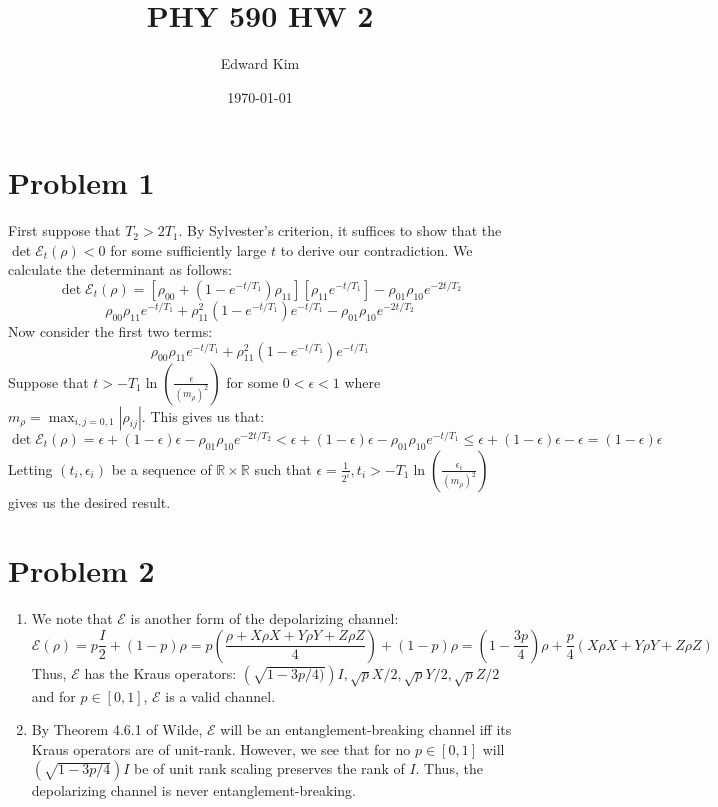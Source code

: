 \documentclass[12pt]{article}%
\begin{document}
\title{PHY 590 HW 2}
\author{Edward Kim}
\date{\today}
\maketitle

\section*{Problem 1}
First suppose that $T_2 > 2T_1$. By Sylvester's criterion, it suffices to show that the $\det{\mathcal{E}_t(\rho)} < 0$ for some sufficiently large $t$ to derive our contradiction. \newline \newline
We calculate the determinant as follows:
$$ \det{\mathcal{E}_t(\rho)} = [\rho_{00} + (1 - e^{-t/T_1})\rho_{11}][\rho_{11} e^{-t/T_1}] - \rho_{01}\rho_{10}e^{-2t/T_2}$$
$$\rho_{00}\rho_{11}e^{-t/T_1} + \rho_{11}^2(1-e^{-t/T_1})e^{-t/T_1}  - \rho_{01}\rho_{10}e^{-2t/T_2} $$
Now consider the first two terms:
$$\rho_{00}\rho_{11}e^{-t/T_1} + \rho_{11}^2(1-e^{-t/T_1})e^{-t/T_1} $$
Suppose that $t > -T_1 \ln(\frac{\epsilon}{(m_\rho)^2})$ for some $0 < \epsilon < 1$ where $m_{\rho} = \max_{i,j = 0,1} |\rho_{ij}|$.
This gives us that:
$$\det{\mathcal{E}_t(\rho)} =  \epsilon + (1-\epsilon)\epsilon - \rho_{01}\rho_{10}e^{-2t/T_2} < \epsilon + (1-\epsilon)\epsilon - \rho_{01}\rho_{10}e^{-t/T_1}  \leq  \epsilon + (1- \epsilon)\epsilon - \epsilon = (1- \epsilon)\epsilon
 $$
Letting $(t_i,\epsilon_i)$ be a sequence of $\mathbb{R} \times \mathbb{R}$ such that $\epsilon = \frac{1}{2^i}, t_i > -T_1 \ln(\frac{\epsilon_i}{(m_\rho)^2})$ gives us the desired result.

\section*{Problem 2}
\begin{enumerate}
  \item We note that $\mathcal{E}$ is another form of the depolarizing channel:
  $$ \mathcal{E}(\rho) = p\frac{I}{2} + (1-p)\rho = p(\frac{\rho + X\rho X + Y \rho Y + Z \rho Z}{4}) + (1-p)\rho = \left(1 - \frac{3p}{4}\right)\rho + \frac{p}{4}(X \rho X + Y \rho Y + Z \rho Z) $$
  Thus, $\mathcal{E}$ has the Kraus operators:
  $(\sqrt{1 - 3p/4)})I,\sqrt{p}X/2, \sqrt{p}Y/2, \sqrt{p}Z/2$ and for $p \in [0,1]$, $\mathcal{E}$ is a valid channel.
  \item By Theorem 4.6.1 of Wilde, $\mathcal{E}$ will be an entanglement-breaking channel iff its Kraus operators are of unit-rank. However, we see that for no $p \in [0,1]$ will $(\sqrt{1 - 3p/4})I$ be of unit rank scaling preserves the rank of $I$. Thus, the depolarizing channel is never entanglement-breaking.
\end{enumerate}
\end{document}
